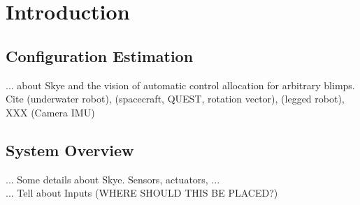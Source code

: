 \chapter{Introduction}
\label{chap:introduction}

\section{Configuration Estimation}
... about Skye and the vision of automatic control allocation for arbitrary blimps. Cite \cite{Doniec} (underwater robot), \cite{Shuster1991} (spacecraft, QUEST, rotation vector), \citep{Bloesch2013} (legged robot), XXX (Camera IMU)

\section{System Overview}
... Some details about Skye. Sensors, actuators, ... \cite{Skye2013}
\\
... Tell about Inputs (WHERE SHOULD THIS BE PLACED?)